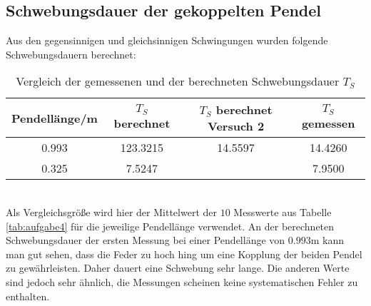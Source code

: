     \subsection{Schwebungsdauer der gekoppelten Pendel}
      Aus den gegensinnigen und gleichsinnigen Schwingungen wurden folgende Schwebungsdauern berechnet:
      \begin{table}
        \centering
          \caption{Vergleich der gemessenen und der berechneten Schwebungsdauer $T_{S}$}
            \label{tab:aufgabe6}
            \begin{tabular}{S S S S}
              \toprule
              {Pendellänge/m} & {$T_{S}$ berechnet} & {$T_{S}$ berechnet Versuch 2} & {$T_{S}$ gemessen} \\
                 &   123.3215 & 14.5597 &  14.4260\\
              0.325   &   7.5247 &           &  7.9500\\
              \bottomrule
            \end{tabular}
          \end{table}
      \\
      Als Vergleichsgröße wird hier der Mittelwert der $10$ Messwerte aus Tabelle \ref{tab:aufgabe4} für die jeweilige
      Pendellänge verwendet.
      An der berechneten Schwebungsdauer der ersten Messung bei einer Pendellänge von $0.993$m kann man gut sehen,
      dass die Feder zu hoch hing um eine Kopplung der beiden Pendel zu gewährleisten. Daher dauert eine Schwebung
      sehr lange. Die anderen Werte sind jedoch sehr ähnlich, die Messungen scheinen keine systematischen Fehler zu enthalten.
\label{sec:Auswertung}
